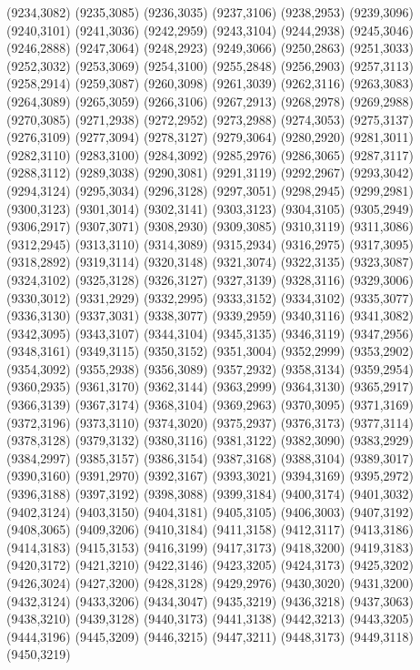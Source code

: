 (9234,3082)
(9235,3085)
(9236,3035)
(9237,3106)
(9238,2953)
(9239,3096)
(9240,3101)
(9241,3036)
(9242,2959)
(9243,3104)
(9244,2938)
(9245,3046)
(9246,2888)
(9247,3064)
(9248,2923)
(9249,3066)
(9250,2863)
(9251,3033)
(9252,3032)
(9253,3069)
(9254,3100)
(9255,2848)
(9256,2903)
(9257,3113)
(9258,2914)
(9259,3087)
(9260,3098)
(9261,3039)
(9262,3116)
(9263,3083)
(9264,3089)
(9265,3059)
(9266,3106)
(9267,2913)
(9268,2978)
(9269,2988)
(9270,3085)
(9271,2938)
(9272,2952)
(9273,2988)
(9274,3053)
(9275,3137)
(9276,3109)
(9277,3094)
(9278,3127)
(9279,3064)
(9280,2920)
(9281,3011)
(9282,3110)
(9283,3100)
(9284,3092)
(9285,2976)
(9286,3065)
(9287,3117)
(9288,3112)
(9289,3038)
(9290,3081)
(9291,3119)
(9292,2967)
(9293,3042)
(9294,3124)
(9295,3034)
(9296,3128)
(9297,3051)
(9298,2945)
(9299,2981)
(9300,3123)
(9301,3014)
(9302,3141)
(9303,3123)
(9304,3105)
(9305,2949)
(9306,2917)
(9307,3071)
(9308,2930)
(9309,3085)
(9310,3119)
(9311,3086)
(9312,2945)
(9313,3110)
(9314,3089)
(9315,2934)
(9316,2975)
(9317,3095)
(9318,2892)
(9319,3114)
(9320,3148)
(9321,3074)
(9322,3135)
(9323,3087)
(9324,3102)
(9325,3128)
(9326,3127)
(9327,3139)
(9328,3116)
(9329,3006)
(9330,3012)
(9331,2929)
(9332,2995)
(9333,3152)
(9334,3102)
(9335,3077)
(9336,3130)
(9337,3031)
(9338,3077)
(9339,2959)
(9340,3116)
(9341,3082)
(9342,3095)
(9343,3107)
(9344,3104)
(9345,3135)
(9346,3119)
(9347,2956)
(9348,3161)
(9349,3115)
(9350,3152)
(9351,3004)
(9352,2999)
(9353,2902)
(9354,3092)
(9355,2938)
(9356,3089)
(9357,2932)
(9358,3134)
(9359,2954)
(9360,2935)
(9361,3170)
(9362,3144)
(9363,2999)
(9364,3130)
(9365,2917)
(9366,3139)
(9367,3174)
(9368,3104)
(9369,2963)
(9370,3095)
(9371,3169)
(9372,3196)
(9373,3110)
(9374,3020)
(9375,2937)
(9376,3173)
(9377,3114)
(9378,3128)
(9379,3132)
(9380,3116)
(9381,3122)
(9382,3090)
(9383,2929)
(9384,2997)
(9385,3157)
(9386,3154)
(9387,3168)
(9388,3104)
(9389,3017)
(9390,3160)
(9391,2970)
(9392,3167)
(9393,3021)
(9394,3169)
(9395,2972)
(9396,3188)
(9397,3192)
(9398,3088)
(9399,3184)
(9400,3174)
(9401,3032)
(9402,3124)
(9403,3150)
(9404,3181)
(9405,3105)
(9406,3003)
(9407,3192)
(9408,3065)
(9409,3206)
(9410,3184)
(9411,3158)
(9412,3117)
(9413,3186)
(9414,3183)
(9415,3153)
(9416,3199)
(9417,3173)
(9418,3200)
(9419,3183)
(9420,3172)
(9421,3210)
(9422,3146)
(9423,3205)
(9424,3173)
(9425,3202)
(9426,3024)
(9427,3200)
(9428,3128)
(9429,2976)
(9430,3020)
(9431,3200)
(9432,3124)
(9433,3206)
(9434,3047)
(9435,3219)
(9436,3218)
(9437,3063)
(9438,3210)
(9439,3128)
(9440,3173)
(9441,3138)
(9442,3213)
(9443,3205)
(9444,3196)
(9445,3209)
(9446,3215)
(9447,3211)
(9448,3173)
(9449,3118)
(9450,3219)
